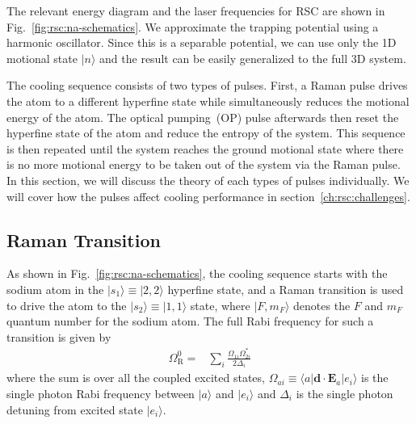 The relevant energy diagram and the laser frequencies for RSC are shown in
Fig.~\ref{fig:rsc:na-schematics}.
We approximate the trapping potential using a harmonic oscillator.
Since this is a separable potential, we can use only the 1D motional state $|n\rangle$
and the result can be easily generalized to the full 3D system.

The cooling sequence consists of two types of pulses.
First, a Raman pulse drives the atom to a different hyperfine state while simultaneously
reduces the motional energy of the atom.
The optical pumping~(OP) pulse afterwards then reset the hyperfine state of the atom
and reduce the entropy of the system.
This sequence is then repeated until the system reaches the ground motional state
where there is no more motional energy to be taken out of the system via the Raman pulse.
In this section, we will discuss the theory of each types of pulses individually.
We will cover how the pulses affect cooling performance in section~\ref{ch:rsc:challenges}.

\subsection{Raman Transition}
\label{ch:rsc:basic-theory:raman}

As shown in Fig.~\ref{fig:rsc:na-schematics},
the cooling sequence starts with the sodium atom in the
$|s_1\rangle\equiv|2,2\rangle$ hyperfine state,
and a Raman transition is used to drive the atom to the $|s_2\rangle\equiv|1,1\rangle$ state,
where $|F,m_F\rangle$ denotes the $F$ and $m_F$ quantum number for the sodium atom.
The full Rabi frequency for such a transition is given by~\cite{knight_quantum_2003}
\begin{align}
  \Omega_{\mathrm{R}}^0=&\sum_{i}\frac{\Omega_{1i}\Omega_{2i}^*}{2\Delta_i}\label{eq:rsc:basic-theory:raman-rabi}
\end{align}
where the sum is over all the coupled excited states,
$\Omega_{ai}\equiv\langle a|\mathbf{d}\cdot\mathbf{E}_a|e_i\rangle$ is the single photon
Rabi frequency between $|a\rangle$ and $|e_i\rangle$
and $\Delta_i$ is the single photon detuning from excited state $|e_i\rangle$.


